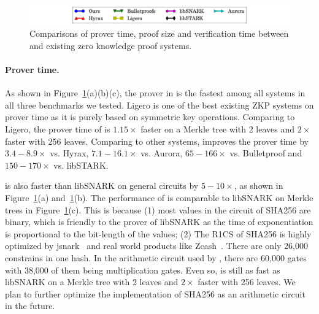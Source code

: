 \begin{figure}[t!]
{	%
}%
%
\quad

\centering
\includegraphics[width = 6in]{legend.pdf}%
\caption{\label{fig:Allcom}Comparisons of prover time, proof size and verification time between \name{} and existing zero knowledge proof systems.}
\end{figure}


\paragraph{Prover time.} As shown in Figure~\ref{fig:Allcom}(a)(b)(c), the prover in \name is the fastest among all systems in all three benchmarks we tested. \textsf{Ligero} is one of the best existing ZKP systems on prover time as it is purely based on symmetric key operations. Comparing to \textsf{Ligero}, the prover time of \name is $1.15\times$ faster on a Merkle tree with 2 leaves and $2\times$ faster with 256 leaves. Comparing to other systems, \name improves the prover time by $3.4-8.9\times$ vs. \textsf{Hyrax}, $7.1-16.1\times$ vs. \textsf{Aurora}, $65-166\times$ vs. \textsf{Bulletproof} and $150-170\times$ vs. \textsf{libSTARK}. 

\name is also faster than \textsf{libSNARK} on general circuits by $5-10\times$, as shown in Figure~\ref{fig:Allcom}(a) and~\ref{fig:Allcom}(b). The performance of \name is comparable to \textsf{libSNARK} on Merkle trees in Figure~\ref{fig:Allcom}(c). This is because (1) most values in the circuit of SHA256 are binary, which is friendly to the prover of \textsf{libSNARK} as the time of exponentiation is proportional to the bit-length of the values; (2) The R1CS of SHA256 is highly optimized by jsnark~\cite{jsnark} and real world products like Zcash~\cite{zerocash}. There are only 26,000 constrains in one hash. In the arithmetic circuit used by \name, there are 60,000 gates with 38,000 of them being multiplication gates. Even so, \name is still as fast as \textsf{libSNARK} on a Merkle tree with 2 leaves and $2\times$ faster with 256 leaves. We plan to further optimize the implementation of SHA256 as an arithmetic circuit in the future.

